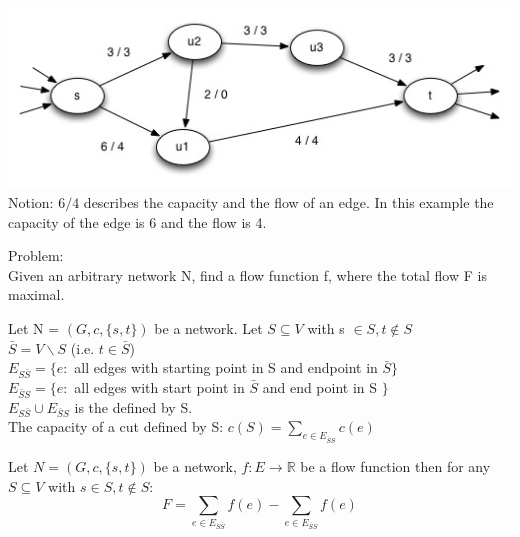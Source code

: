 \begin{example}
\includegraphics{diagrams/Chapter3_Example1.jpg}
\\Notion: $ 6 / 4 $ describes the capacity and the flow of an edge. In this example the capacity of the edge is 6 and the flow is 4.
\end{example}

Problem: \\
Given an arbitrary network N, find a flow function f, where the total flow F is maximal. \\

\begin{definition}
Let N = $(G, c, \{s, t\})$ be a network. Let $S \subseteq V$ with s $\in S, t \notin S$ \\
$\bar{S} = V \backslash S$ (i.e. $t \in \bar{S}$) \\
$E_{S\bar{S}} = \{e:$ all edges with starting point in S and endpoint in $\bar{S} \}$ \\
$E_{\bar{S}S} = \{e:$ all edges with start point in $\bar{S}$ and end point in S $\}$ \\
$E_{S\bar{S}} \cup E_{\bar{S}S} $ is the  defined by S. \\
The capacity of a cut defined by S: $c(S) = \sum_{e \in E_{\bar{S}S}}c(e)$
\end{definition}

\begin{lemma}
Let $N =(G, c, \{s, t\})$ be a network, $f: E \rightarrow \mathds{R}$ be a flow function then for any $S \subseteq V$ with $s \in S, t \notin S$: 
\[
F = \sum_{e \in E_{S\bar{S}}}f(e) - \sum_{e \in E_{\bar{S}S}} f(e)
\]
\end{lemma}

